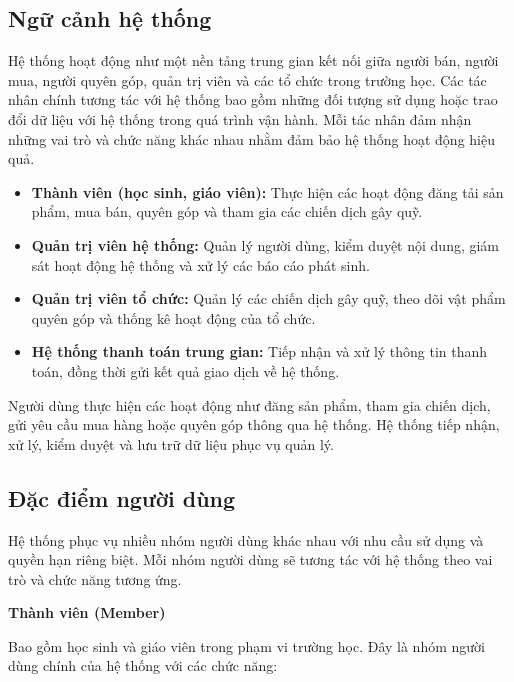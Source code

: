 \documentclass[12pt,a4paper]{report}
\begin{document}
\subsection{Ngữ cảnh hệ thống}

Hệ thống hoạt động như một nền tảng trung gian kết nối giữa người bán, người mua, người quyên góp, quản trị viên và các tổ chức trong trường học. Các tác nhân chính tương tác với hệ thống bao gồm những đối tượng sử dụng hoặc trao đổi dữ liệu với hệ thống trong quá trình vận hành. Mỗi tác nhân đảm nhận những vai trò và chức năng khác nhau nhằm đảm bảo hệ thống hoạt động hiệu quả.

\begin{itemize}[label=--, leftmargin=1.2cm]

\item \textbf{Thành viên (học sinh, giáo viên):} Thực hiện các hoạt động đăng tải sản phẩm, mua bán, quyên góp và tham gia các chiến dịch gây quỹ.

\item \textbf{Quản trị viên hệ thống:} Quản lý người dùng, kiểm duyệt nội dung, giám sát hoạt động hệ thống và xử lý các báo cáo phát sinh.

\item \textbf{Quản trị viên tổ chức:} Quản lý các chiến dịch gây quỹ, theo dõi vật phẩm quyên góp và thống kê hoạt động của tổ chức.

\item \textbf{Hệ thống thanh toán trung gian:} Tiếp nhận và xử lý thông tin thanh toán, đồng thời gửi kết quả giao dịch về hệ thống.

\end{itemize}

Người dùng thực hiện các hoạt động như đăng sản phẩm, tham gia chiến dịch, gửi yêu cầu mua hàng hoặc quyên góp thông qua hệ thống. Hệ thống tiếp nhận, xử lý, kiểm duyệt và lưu trữ dữ liệu phục vụ quản lý.

\subsection{Đặc điểm người dùng}

Hệ thống phục vụ nhiều nhóm người dùng khác nhau với nhu cầu sử dụng và quyền hạn riêng biệt. Mỗi nhóm người dùng sẽ tương tác với hệ thống theo vai trò và chức năng tương ứng.

\textbf{Thành viên (Member)}

Bao gồm học sinh và giáo viên trong phạm vi trường học. Đây là nhóm người dùng chính của hệ thống với các chức năng:
\end{document}
